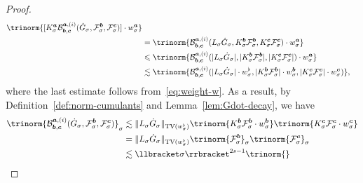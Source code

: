\documentclass{article}
\numberwithin{equation}{section}
\theoremstyle{plain}
\theoremstyle{definition}
\begin{document}
\begin{proof}
\[\begin{aligned}
       \trinorm{ [K_{\sigma}^{\boldsymbol{a}} \mathcal{B}^{\boldsymbol{a},
       (i)}_{\boldsymbol{b}, \boldsymbol{c}} (\dot{G}_{\sigma},
       \mathcal{F}^{\boldsymbol{b}}_{\sigma},
       \mathcal{F}^{\boldsymbol{c}}_{\sigma})] \cdot w_{\sigma}^{\boldsymbol{a}}
       }\\
       & =  \trinorm{ \mathcal{B}^{\boldsymbol{a}, (i)}_{\boldsymbol{b},
       \boldsymbol{c}} (L_{\sigma} \dot{G}_{\sigma}, K_{\sigma}^{\boldsymbol{b}}
       \mathcal{F}^{\boldsymbol{b}}_{\sigma}, K_{\sigma}^{\boldsymbol{c}}
       \mathcal{F}^{\boldsymbol{c}}_{\sigma}) \cdot w_{\sigma}^{\boldsymbol{a}}
       }\\
       & \leqslant  \trinorm{ \mathcal{B}^{\boldsymbol{a},
       (i)}_{\boldsymbol{b}, \boldsymbol{c}} (| L_{\sigma} \dot{G}_{\sigma} |, |
       K_{\sigma}^{\boldsymbol{b}} \mathcal{F}^{\boldsymbol{b}}_{\sigma} |, |
       K_{\sigma}^{\boldsymbol{c}} \mathcal{F}^{\boldsymbol{c}}_{\sigma} |) \cdot
       w_{\sigma}^{\boldsymbol{a}} }\\
       & \lesssim  \trinorm{ \mathcal{B}^{\boldsymbol{a},
       (i)}_{\boldsymbol{b}, \boldsymbol{c}} (| L_{\sigma} \dot{G}_{\sigma} |
       \cdot w_{\sigma}^{\flat},| K_{\sigma}^{\boldsymbol{b}}
       \mathcal{F}^{\boldsymbol{b}}_{\sigma} | \cdot w_{\sigma}^{\boldsymbol{b}},
       | K_{\sigma}^{\boldsymbol{c}} \mathcal{F}^{\boldsymbol{c}}_{\sigma} | \cdot
       w_{\sigma}^{\boldsymbol{c}}) },
     \end{aligned} \]
  where the last estimate follows from~\eqref{eq:weight-w}. As a result, by
  Definition~\ref{def:norm-cumulants} and Lemma~\ref{lem:Gdot-decay}, we have
  \begin{align*}
    \trinorm{ \mathcal{B}^{\boldsymbol{a}, (i)}_{\boldsymbol{b}, \boldsymbol{c}}
    (\dot{G}_{\sigma}, \mathcal{F}^{\boldsymbol{b}}_{\sigma},
    \mathcal{F}^{\boldsymbol{c}}_{\sigma}) }_{\sigma} &\lesssim  \|
    L_{\sigma} \dot{G}_{\sigma} \|_{\operatorname{TV} (w^{\flat}_{\sigma})} 
    \trinorm{ K_{\sigma}^{\boldsymbol{b}} \mathcal{F}^{\boldsymbol{b}}_{\sigma}
    \cdot w_{\sigma}^{\boldsymbol{b}} }  \trinorm{
    K_{\sigma}^{\boldsymbol{c}} \mathcal{F}^{\boldsymbol{c}}_{\sigma} \cdot
    w_{\sigma}^{\boldsymbol{c}} }\\
 &=  \| L_{\sigma} \dot{G}_{\sigma} \|_{\operatorname{TV} (w^{\flat}_{\sigma})} 
    \trinorm{ \mathcal{F}^{\boldsymbol{b}}_{\sigma} }_{\sigma} 
    \trinorm{ \mathcal{F}^{\boldsymbol{c}}_{\sigma} }_{\sigma}\\
 &\lesssim  \llbracket \sigma \rrbracket^{2 s - 1} \trinorm{
}
\end{align*}
\end{proof}
\end{document}
